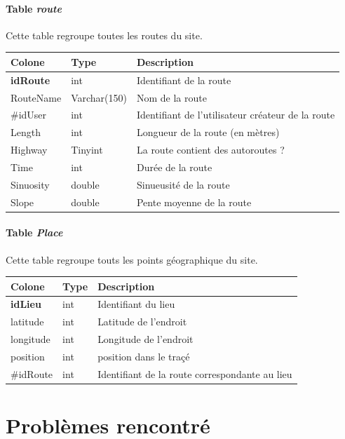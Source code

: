 \documentclass[a4paper]{article}
\begin{document}
\paragraph{Table \emph{route}}
Cette table regroupe toutes les routes du site.

\begin{tabular}{|l|l|l|}
	\hline
	Colone          & Type         & Description                  \\ \hline\hline
	\textbf{idRoute}& int & Identifiant de la route \\ \hline
	RouteName & Varchar(150) & Nom de la route \\ \hline
	\#idUser & int & Identifiant de l'utilisateur créateur de la route \\ \hline
	Length & int & Longueur de la route (en mètres) \\ \hline
	Highway & Tinyint & La route contient des autoroutes ? \\ \hline
	Time & int & Durée de la route \\ \hline
	Sinuosity & double & Sinueusité de la route \\ \hline
	Slope & double & Pente moyenne de la route \\ \hline
\end{tabular}

\paragraph{Table \emph{Place}}
Cette table regroupe touts les points géographique du site.

\begin{tabular}{|l|l|l|}
	\hline
	Colone          & Type         & Description                  \\ \hline\hline
	\textbf{idLieu} & int & Identifiant du lieu \\ \hline
	latitude & int & Latitude de l'endroit \\ \hline
	longitude & int & Longitude de l'endroit \\ \hline
	position & int& position dans le traçé \\ \hline
	\#idRoute & int & Identifiant de la route correspondante au lieu \\ \hline
\end{tabular}
\pagebreak




\section{Problèmes rencontré}
\end{document}
